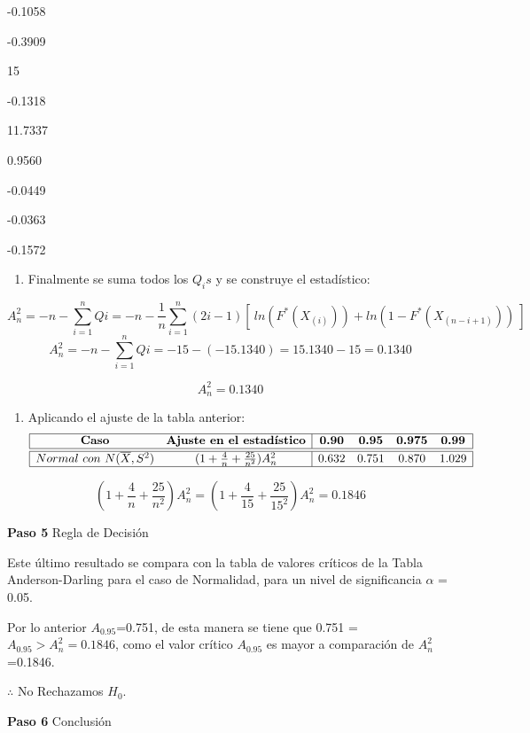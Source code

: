 \documentclass[
  a4paper,
  oneside,
  openany]{book}
\providecommand{\tightlist}{%
  \setlength{\itemsep}{0pt}\setlength{\parskip}{0pt}}
\begin{document}
-0.1058

-0.3909

15

-0.1318

11.7337

0.9560

-0.0449

-0.0363

-0.1572

\begin{enumerate}
\def\labelenumi{\arabic{enumi})}
\setcounter{enumi}{6}
\tightlist
\item
  Finalmente se suma todos los \(Q_{i}s\) y se construye el estadístico:
\end{enumerate}

\[A_n^2=-n-\sum_{i=1}^{n}Qi=-n-\frac{1}{n}\sum_{i=1}^{n}\left(2i-1\right)[ \ ln(F^*(X_{(i)})) +ln(1-F^*(X_{(n-i+1)})) \ ]\]
\[A_n^2=-n-\sum_{i=1}^{n}Qi=-15-(-15.1340)=15.1340-15=0.1340\]

\[A_n^2=0.1340\]

\begin{enumerate}
\def\labelenumi{\arabic{enumi})}
\setcounter{enumi}{7}
\tightlist
\item
  Aplicando el ajuste de la tabla anterior:
  \[
  \begin{array}{|c c| c c c c|}
  \hline
  \textbf{Caso} & \textbf{Ajuste en el estadístico} &\textbf{0.90} &\textbf{0.95} & \textbf{0.975} & \textbf{0.99} \\
  \hline
  \hline
  Normal\ con\ N(\overline{X},S^2) & (1+\frac{4}{n}+\frac{25}{n^2})A_{n}^{2} & 0.632 & 0.751 & 0.870 & 1.029 \\
  \hline
  \end{array}
  \]
\end{enumerate}

\[ (1+\frac{4}{n}+\frac{25}{n^2})A_{n}^{2}=(1+\frac{4}{15}+\frac{25}{15^2})A_{n}^{2}=0.1846\]

\textbf{Paso 5} Regla de Decisión

Este último resultado se compara con la tabla de valores críticos de la Tabla Anderson-Darling para el caso de Normalidad, para un nivel de significancia \(\alpha\) = 0.05.

Por lo anterior \(A_{0.95}\)=0.751, de esta manera se tiene que 0.751 = \(A_{0.95} > A_{n}^2=0.1846\), como el valor crítico \(A_{0.95}\) es mayor a comparación de \(A_{n}^2\)=0.1846.

\(\therefore\) No Rechazamos \(H_0\).

\textbf{Paso 6} Conclusión
\end{document}
